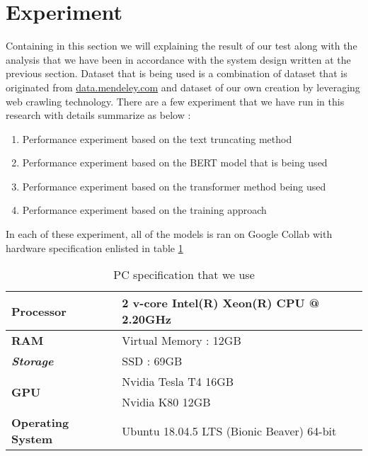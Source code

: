 \section{Experiment}
\label{sec:experiment}

Containing in this section we will explaining the result of our test along with the analysis that we have been in accordance with the system design written at the previous section. Dataset that is being used is a combination of dataset that is originated from \url{data.mendeley.com} and dataset of our own creation by leveraging web crawling technology. There are a few experiment that we have run in this research with details summarize as below :

\begin{enumerate}[nolistsep]
  \item Performance experiment based on the text truncating method
  \item Performance experiment based on the BERT model that is being used
  \item Performance experiment based on the transformer method being used
  \item Performance experiment based on the training approach
\end{enumerate}

In each of these experiment, all of the models is ran on Google Collab with hardware specification enlisted in table \ref{tab:specs_collab}

\begin{table}[h]
  \caption{PC specification that we use}
  \label{tab:specs_collab}
  \centering
  \begin{tabular}{|l|l|}
    \hline
    \textbf{Processor}            & 2 v-core Intel(R) Xeon(R) CPU @ 2.20GHz   \\ \hline
    \textbf{RAM}                  & Virtual Memory : 12GB                     \\ \hline
    \textit{\textbf{Storage}}     & SSD : 69GB                                \\ \hline
    \multirow{2}{*}{\textbf{GPU}} & Nvidia Tesla T4 16GB                      \\ \cline{2-2}
                                  & Nvidia K80 12GB                           \\ \hline
    \textbf{Operating System}     & Ubuntu 18.04.5 LTS (Bionic Beaver) 64-bit \\ \hline
  \end{tabular}
\end{table}

